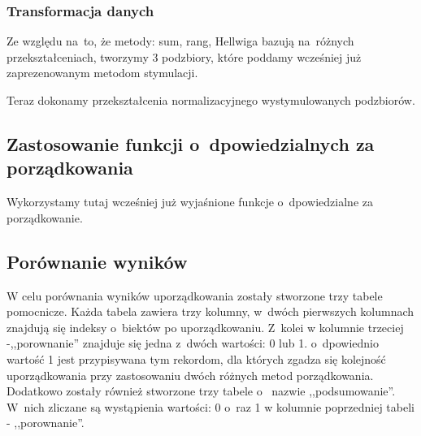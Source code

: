 \documentclass[12pt,a4paper]{report}
\begin{document}
{\subsubsection{Transformacja danych}
Ze względu na~to, że metody: sum, rang, Hellwiga bazują na~różnych przekształceniach, tworzymy 3 podzbiory, które poddamy wcześniej już zaprezenowanym metodom stymulacji. 
\begin{Shaded}
\begin{Highlighting}[]
\NormalTok{)}
\NormalTok{)}
\NormalTok{)}
\end{Highlighting}
\end{Shaded}
Teraz dokonamy przekształcenia normalizacyjnego wystymulowanych
podzbiorów.
\begin{Shaded}
\begin{Highlighting}[]
\end{Highlighting}
\end{Shaded}
\subsection{Zastosowanie funkcji o~dpowiedzialnych za porządkowania}
Wykorzystamy tutaj wcześniej już wyjaśnione funkcje o~dpowiedzialne za porządkowanie. 
\begin{Shaded}
\begin{Highlighting}[]
\end{Highlighting}
\end{Shaded}
\subsection{Porównanie wyników}\label{porownanie-3metody}
W celu porównania wyników uporządkowania zostały stworzone trzy tabele
pomocnicze. Każda tabela zawiera trzy kolumny, w~dwóch pierwszych
kolumnach znajdują się indeksy o~biektów po uporządkowaniu. Z~kolei w
kolumnie trzeciej -,,porownanie'' znajduje się jedna z~dwóch wartości: 0
lub 1. o~dpowiednio wartość 1 jest przypisywana tym rekordom, dla których
zgadza się kolejność uporządkowania przy zastosowaniu dwóch różnych
metod porządkowania. Dodatkowo zostały również stworzone trzy tabele o~
nazwie ,,podsumowanie''. W~nich zliczane są wystąpienia wartości: 0 o~raz 1 
w kolumnie poprzedniej tabeli - ,,porownanie''.
}
\end{document}
